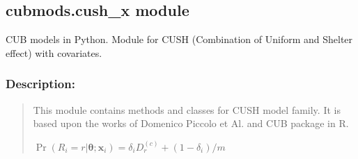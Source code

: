 \documentclass[letterpaper,10pt,english]{sphinxmanual}
\begin{document}
\subsection{cubmods.cush\_x module}
\label{\detokenize{cubmods:module-cubmods.cush_x}}\label{\detokenize{cubmods:cubmods-cush-x-module}}
\sphinxAtStartPar
CUB models in Python.
Module for CUSH (Combination of Uniform
and Shelter effect) with covariates.


\subsubsection{Description:}
\label{\detokenize{cubmods:id202}}\begin{quote}

\sphinxAtStartPar
This module contains methods and classes
for CUSH model family.
It is based upon the works of Domenico
Piccolo et Al. and CUB package in R.

\sphinxAtStartPar
\(\Pr(R_i=r|\pmb \theta; \pmb x_i) = \delta_i D_{r}^{(c)} + (1 - \delta_i)/m\)
\end{quote}
\end{document}
